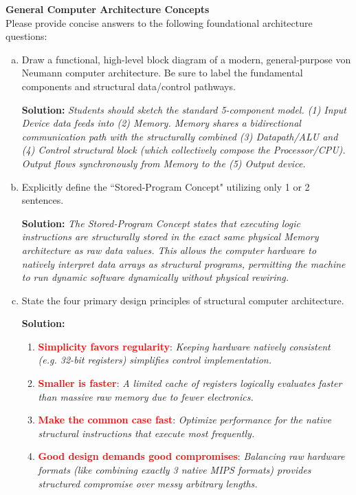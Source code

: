 \documentclass[letterpaper]{report}
\begin{document}
%
 {\bf General Computer Architecture Concepts} \\
Please provide concise answers to the following foundational architecture questions:
\begin{enumerate}[(a)]
    \item Draw a functional, high-level block diagram of a modern, general-purpose von Neumann computer architecture. Be sure to label the fundamental components and structural data/control pathways.
    
    {\color{red} \textbf{Solution:} \textit{Students should sketch the standard 5-component model. (1) Input Device data feeds into (2) Memory. Memory shares a bidirectional communication path with the structurally combined (3) Datapath/ALU and (4) Control structural block (which collectively compose the Processor/CPU). Output flows synchronously from Memory to the (5) Output device.}}

    \item Explicitly define the ``Stored-Program Concept" utilizing only 1 or 2 sentences.
    
    {\color{red} \textbf{Solution:} \textit{The Stored-Program Concept states that executing logic instructions are structurally stored in the exact same physical Memory architecture as raw data values. This allows the computer hardware to natively interpret data arrays as structural programs, permitting the machine to run dynamic software dynamically without physical rewiring.}}

    \item State the four primary design principles of structural computer architecture.
    
    {\color{red} \textbf{Solution:} \begin{enumerate}
        \item \textcolor{red}{\textbf{Simplicity favors regularity}}: \textit{Keeping hardware natively consistent (e.g. 32-bit registers) simplifies control implementation.}
        \item \textcolor{red}{\textbf{Smaller is faster}}: \textit{A limited cache of registers logically evaluates faster than massive raw memory due to fewer electronics.}
        \item \textcolor{red}{\textbf{Make the common case fast}}: \textit{Optimize performance for the native structural instructions that execute most frequently.}
        \item \textcolor{red}{\textbf{Good design demands good compromises}}: \textit{Balancing raw hardware formats (like combining exactly 3 native MIPS formats) provides structured compromise over messy arbitrary lengths.}
    \end{enumerate}}


\end{enumerate}
\end{document}
